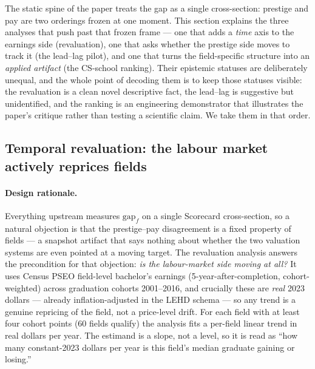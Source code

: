 \documentclass[11pt]{article}
\begin{document}
The static spine of the paper treats the gap as a single cross-section: prestige and pay are two orderings frozen at one moment. This section explains the three analyses that push past that frozen frame --- one that adds a \emph{time} axis to the earnings side (revaluation), one that asks whether the prestige side moves to track it (the lead--lag pilot), and one that turns the field-specific structure into an \emph{applied artifact} (the CS-school ranking). Their epistemic statuses are deliberately unequal, and the whole point of decoding them is to keep those statuses visible: the revaluation is a clean novel descriptive fact, the lead--lag is suggestive but unidentified, and the ranking is an engineering demonstrator that illustrates the paper's critique rather than testing a scientific claim. We take them in that order.

\subsection{Temporal revaluation: the labour market actively reprices fields}\label{sec:reval}

\paragraph{Design rationale.} Everything upstream measures $\mathrm{gap}_f$ on a single Scorecard cross-section, so a natural objection is that the prestige--pay disagreement is a fixed property of fields --- a snapshot artifact that says nothing about whether the two valuation systems are even pointed at a moving target. The revaluation analysis answers the precondition for that objection: \emph{is the labour-market side moving at all?} It uses Census PSEO field-level bachelor's earnings (5-year-after-completion, cohort-weighted) across graduation cohorts 2001--2016, and crucially these are \emph{real} 2023 dollars --- already inflation-adjusted in the LEHD schema --- so any trend is a genuine repricing of the field, not a price-level drift. For each field with at least four cohort points (60 fields qualify) the analysis fits a per-field linear trend in real dollars per year. The estimand is a slope, not a level, so it is read as ``how many constant-2023 dollars per year is this field's median graduate gaining or losing.''
\end{document}
